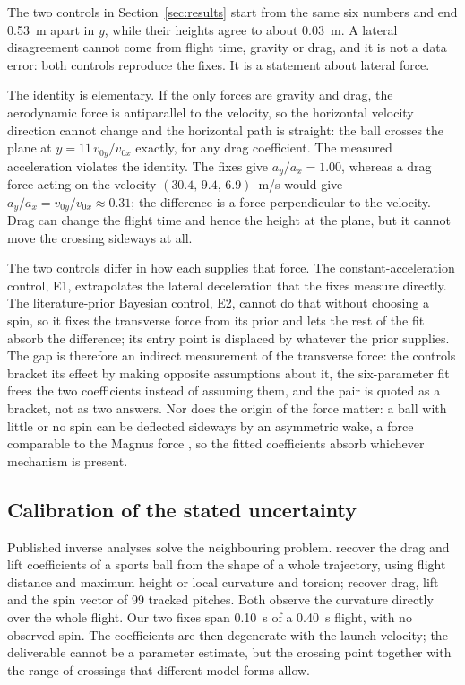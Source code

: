 The two controls in Section~\ref{sec:results} start from the same
six numbers and end \SI{0.53}{m} apart in $y$, while their heights agree to
about \SI{0.03}{m}. A lateral disagreement cannot come from flight time,
gravity or drag, and it is not a data error: both controls reproduce the
fixes. It is a statement about lateral force.

The identity is elementary. If the only forces are gravity and drag,
the aerodynamic force is antiparallel to the velocity, so the horizontal
velocity direction cannot change and the horizontal path is straight: the ball
crosses the plane at $y=11\,v_{0y}/v_{0x}$ exactly, for any drag coefficient.
The measured acceleration violates the identity. The fixes give
$a_y/a_x=1.00$, whereas a drag force acting on the velocity
$(30.4,\,9.4,\,6.9)$~m/s would give $a_y/a_x=v_{0y}/v_{0x}\approx0.31$; the
difference is a force perpendicular to the velocity. Drag can change the
flight time and hence the height at the plane, but it cannot move the crossing
sideways at all.

The two controls differ in how each supplies that force. The
constant-acceleration control, E1, extrapolates the lateral deceleration that
the fixes measure directly. The literature-prior Bayesian control, E2, cannot
do that without choosing a spin, so it fixes the transverse force from its prior
and lets the rest of the fit absorb the difference; its entry point is
displaced by whatever the prior supplies. The gap is therefore an indirect
measurement of the transverse force: the controls bracket its effect by making
opposite assumptions about it, the six-parameter fit frees the two coefficients
instead of assuming them, and the pair is quoted as a bracket, not as two
answers. Nor does the origin of the force matter: a ball
with little or no spin can be deflected sideways by an asymmetric wake, a
force comparable to the Magnus force \citep{texier2016}, so the fitted
coefficients absorb whichever mechanism is present.

\subsection{Calibration of the stated uncertainty}
\label{sec:disc-honesty}

Published inverse analyses solve the neighbouring problem. \citep{jsme2014}
recover the drag and lift coefficients of a sports ball from the shape of a
whole trajectory, using flight distance and maximum height or local curvature
and torsion; \citep{nathan2008pitchfx} recover drag, lift and the spin vector
of \num{99} tracked pitches. Both observe the curvature directly over the
whole flight. Our two fixes span
\SI{0.10}{s} of a \SI{0.40}{s} flight, with no observed spin. The coefficients
are then degenerate with the launch velocity; the deliverable cannot be a
parameter estimate, but the crossing point together with the range of crossings
that different model forms allow.

